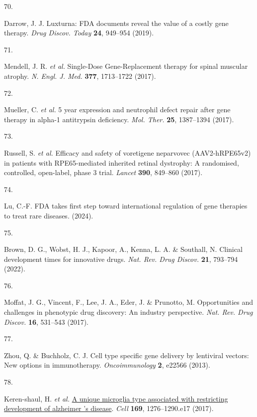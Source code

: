 \documentclass[
]{report}
\newlength{\cslhangindent}
\newlength{\csllabelwidth}
\newenvironment{CSLReferences}[2] %
 {\begin{list}{}{%
  \setlength{\itemindent}{0pt}
  \setlength{\leftmargin}{0pt}
  \setlength{\parsep}{0pt}
  \ifodd #1
   \setlength{\leftmargin}{\cslhangindent}
   \setlength{\itemindent}{-1\cslhangindent}
  \fi
  \setlength{\itemsep}{#2\baselineskip}}}
 {\end{list}}
\newcommand{\CSLLeftMargin}[1]{\parbox[t]{\csllabelwidth}{\strut#1\strut}}
\newcommand{\CSLRightInline}[1]{\parbox[t]{\linewidth - \csllabelwidth}{\strut#1\strut}}
\begin{document}
\begin{CSLReferences}{0}{0}
\CSLLeftMargin{70. }%
\CSLRightInline{Darrow, J. J. Luxturna: {FDA} documents reveal the value
of a costly gene therapy. \emph{Drug Discov. Today} \textbf{24},
949--954 (2019).}

\CSLLeftMargin{71. }%
\CSLRightInline{Mendell, J. R. \emph{et al.} {Single-Dose}
{Gene-Replacement} therapy for spinal muscular atrophy. \emph{N. Engl.
J. Med.} \textbf{377}, 1713--1722 (2017).}

\CSLLeftMargin{72. }%
\CSLRightInline{Mueller, C. \emph{et al.} 5 year expression and
neutrophil defect repair after gene therapy in alpha-1 antitrypsin
deficiency. \emph{Mol. Ther.} \textbf{25}, 1387--1394 (2017).}

\CSLLeftMargin{73. }%
\CSLRightInline{Russell, S. \emph{et al.} Efficacy and safety of
voretigene neparvovec ({AAV2-hRPE65v2}) in patients with
{RPE65-mediated} inherited retinal dystrophy: A randomised, controlled,
open-label, phase 3 trial. \emph{Lancet} \textbf{390}, 849--860 (2017).}

\CSLLeftMargin{74. }%
\CSLRightInline{Lu, C.-F. {FDA} takes first step toward international
regulation of gene therapies to treat rare diseases. (2024).}

\CSLLeftMargin{75. }%
\CSLRightInline{Brown, D. G., Wobst, H. J., Kapoor, A., Kenna, L. A. \&
Southall, N. Clinical development times for innovative drugs. \emph{Nat.
Rev. Drug Discov.} \textbf{21}, 793--794 (2022).}

\CSLLeftMargin{76. }%
\CSLRightInline{Moffat, J. G., Vincent, F., Lee, J. A., Eder, J. \&
Prunotto, M. Opportunities and challenges in phenotypic drug discovery:
An industry perspective. \emph{Nat. Rev. Drug Discov.} \textbf{16},
531--543 (2017).}

\CSLLeftMargin{77. }%
\CSLRightInline{Zhou, Q. \& Buchholz, C. J. Cell type specific gene
delivery by lentiviral vectors: New options in immunotherapy.
\emph{Oncoimmunology} \textbf{2}, e22566 (2013).}

\CSLLeftMargin{78. }%
\CSLRightInline{Keren-shaul, H. \emph{et al.}
\href{https://doi.org/10.1016/j.cell.2017.05.018}{A unique microglia
type associated with restricting development of alzheimer 's disease}.
\emph{Cell} \textbf{169}, 1276--1290.e17 (2017).}


\end{CSLReferences}
\end{document}

